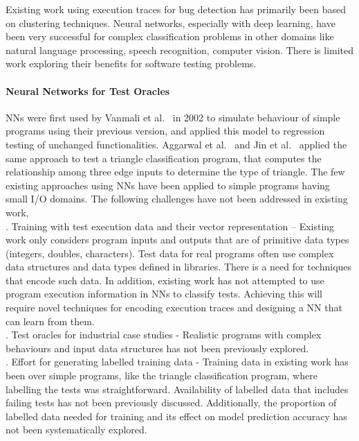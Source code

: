 Existing work using execution traces for bug detection has primarily been based on clustering techniques. Neural networks, especially with deep learning, have been very successful for complex classification problems in other domains like natural language processing, speech recognition, computer vision. There is limited work exploring their benefits for software testing problems.  


\paragraph{Neural Networks for Test Oracles} 
NNs were first used by Vanmali et al.~\cite{vanmali2002using} in 2002 to simulate behaviour of simple programs
using their previous version, and applied this model to regression testing of unchanged functionalities. 
Aggarwal et al.~\cite{aggarwal2004neural} and Jin et al.~\cite{jin2008artificial} applied the same approach to test a triangle classification program, that computes the relationship among three edge inputs to determine the type of triangle. 
The few existing approaches using NNs have been applied to simple programs having small I/O domains.
The following challenges have not been addressed in existing work, \\ 
 . Training with test execution data and their vector representation -- Existing work only considers program inputs and outputs that are of primitive data types (integers, doubles, characters). %
 Test data for real programs often use complex data structures and data types defined in libraries. There is a need for techniques that encode such data. In addition, existing work has not attempted to use program execution information in NNs to classify tests.  Achieving this will require novel techniques for encoding execution traces and designing a NN that can learn from them.    \\
 . Test oracles for industrial case studies - Realistic programs with complex behaviours and input data structures has not been previously explored. \\
 . Effort for generating labelled training data - Training data in existing work has been over simple programs, like the triangle classification program, where labelling the tests was straightforward. Availability of labelled data that includes failing tests has not been previously discussed. Additionally, the proportion of labelled data needed for training and its effect on model prediction accuracy has not been systematically explored. 

